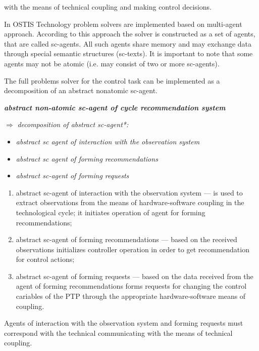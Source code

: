 \documentclass{article}
\begin{document}
\begin{minipage}[t]{0.45\textwidth}
    with the means of technical coupling and making control decisions.

    \hspace{0.2cm} In OSTIS Technology problem solvers are implemented based on multi-agent approach. According to this approach the solver is constructed as a set of agents, that are called sc-agents. All such agents share memory and may exchange data through special semantic structures (sc-texts). It is important to note  that some agents may not be atomic (i.e. may consist of two or more sc-agents).

    \hspace{0.2cm} The full problems solver for the control task can be implemented as a decomposition of an abstract nonatomic sc-agent.

    \textbf{\textit{abstract non-atomic sc-agent of cycle recommendation system}}

    $\Rightarrow$ \hspace{0.7cm}\textit{decomposition of abstract sc-agent*:}
\begin{mylist}
  \item \begin{itemize} 
    \item \textit{abstract sc agent of interaction with the observation system}
    \item \textit{abstract sc agent of forming recommendations}
    \item \textit{abstract sc-agent of forming requests}
  \end{itemize}
\end{mylist}
    \begin{enumerate}[label={\arabic*)}, noitemsep]
    \item abstract sc-agent of interaction with the observation system — is used to extract observations from the means of hardware-software coupling in the technological cycle; it initiates operation of agent for forming recommendations;
    
    \item abstract sc-agent of forming recommendations — based on the received observations initializes controller operation in order to get recommendation for control actions;
    
    \item abstract sc-agent of forming requests — based on the data received from the agent of forming recommendations forms requests for changing the control cariables of the PTP through the appropriate hardware-software means of coupling.
    \end{enumerate}
    \vspace*{-0.8em}
    \hspace{0.2cm} Agents of interaction with the observation system and forming requests must correspond with the technical communicating with the means of technical coupling.


\end{minipage}
\end{document}
